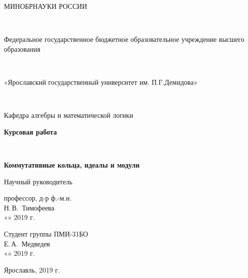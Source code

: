 
\begin{titlepage}
\parindent=1.25cm

	\begin{center}
		{\large МИНОБРНАУКИ РОССИИ
			
		~
		
		Федеральное государственное бюджетное образовательное учреждение высшего образования		
		
		~
		
		«Ярославский государственный университет им. П.Г.Демидова»
		
		~
		
		Кафедра алгебры и математической логики}
		\vfill
		
		\textbf{{\large Курсовая работа}}
		
		~
		
		\textbf{{\large Коммутативные кольца, идеалы и модули}}
	\end{center}
	\vfill
	
	\newlength{\ML}
	\hfill\begin{minipage}{0.45\textwidth}
		Научный руководитель
		
		профессор, д-р ф.-м.н.
		\\
		\underline{\hspace{\ML}} Н.\,В.~Тимофеева\\
		«\underline{\hspace{0.7cm}}» \underline{\hspace{2cm}} 2019 г.
	\end{minipage}%
	\bigskip
	
	\hfill\begin{minipage}{0.45\textwidth}
		Студент группы ПМИ-31БО
		\\
		\underline{\hspace{\ML}} Е.\,А.~Медведев\\
		«\underline{\hspace{0.7cm}}» \underline{\hspace{2cm}} 2019 г.
	\end{minipage}%
	\vfill
	
	\begin{center}
		Ярославль, 2019 г.
	\end{center}
\end{titlepage}